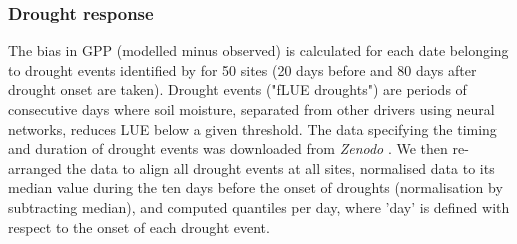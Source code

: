 \documentclass{myreport}
\newcommand{\coo}{CO$_2$}
\begin{document}

\subsubsection{Drought response}
\label{sec:droughtresponse}
The bias in GPP (modelled minus observed) is calculated for each date belonging to drought events identified by \cite{stocker18newphyt} for 50 sites (20 days before and 80 days after drought onset are taken). Drought events ("fLUE droughts") are periods of consecutive days where soil moisture, separated from other drivers using neural networks, reduces LUE below a given threshold. The data specifying the timing and duration of drought events was downloaded from \textit{Zenodo} \citep{flue}. We then re-arranged the data to align all drought events at all sites, normalised data to its median value during the ten days before the onset of droughts (normalisation by subtracting median), and computed quantiles per day, where 'day' is defined with respect to the onset of each drought event.
\end{document}
